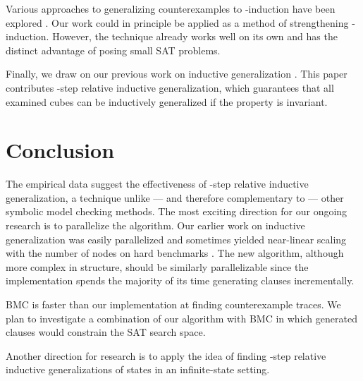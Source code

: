 \documentclass{llncs}
\begin{document}
Various approaches to generalizing counterexamples to -induction
have been explored
\cite{DeMoura+Others/2003,Awedh+Others/2006,Vimjam+Others/2006}.  Our
work could in principle be applied as a method of strengthening
-induction.  However, the technique already works well on its own
and has the distinct advantage of posing small SAT problems.

Finally, we draw on our previous work on inductive generalization
\cite{Bradley+Manna/2007}.  This paper contributes -step relative
inductive generalization, which guarantees that all examined cubes can
be inductively generalized if the property is invariant.

\section{Conclusion}

The empirical data suggest the effectiveness of -step relative
inductive generalization, a technique unlike --- and therefore
complementary to --- other symbolic model checking methods.  The most
exciting direction for our ongoing research is to parallelize the
algorithm.  Our earlier work on inductive generalization was easily
parallelized and sometimes yielded near-linear scaling with the number
of nodes on hard benchmarks \cite{Bradley/2007}.  The new algorithm,
although more complex in structure, should be similarly parallelizable
since the implementation spends the majority of its time generating
clauses incrementally.

BMC is faster than our implementation at finding counterexample
traces.  We plan to investigate a combination of our algorithm with
BMC in which generated clauses would constrain the SAT search space.

Another direction for research is to apply the idea of finding
-step relative inductive generalizations of states in an
infinite-state setting.
\end{document}
